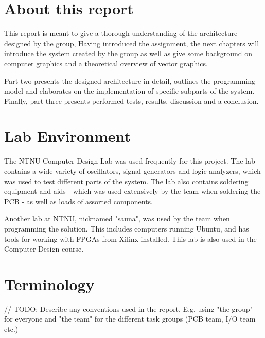 \section{About this report}

This report is meant to give a thorough understanding of the architecture designed by the group,
Having introduced the assignment, the next chapters will introduce the system created by the group as well as give some background on computer graphics and a theoretical overview of vector graphics.


Part two presents the designed architecture in detail, outlines the programming model and elaborates on the implementation of specific subparts of the system.
Finally, part three presents performed tests, results, discussion and a conclusion.


\section{Lab Environment}
The NTNU Computer Design Lab was used frequently for this project. The lab contains a wide variety of oscillators, signal generators and logic analyzers, which was used to test different parts of the system. The lab also contains soldering equipment and aids - which was used extensively by the team when soldering the PCB - as well as loads of assorted components.

Another lab at NTNU, nicknamed "sauna", was used by the team when programming the solution. This includes computers running Ubuntu, and has tools for working with FPGAs from Xilinx installed. This lab is also used in the Computer Design course.

\section{Terminology}
// TODO: Describe any conventions used in the report. E.g. using "the group" for everyone and "the team" for the different task groups (PCB team, I/O team etc.)